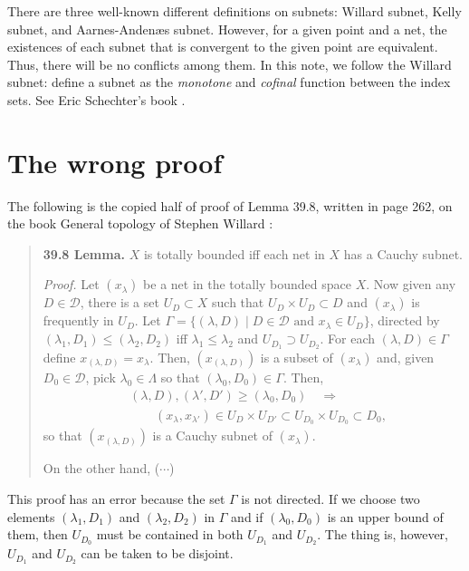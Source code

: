 \documentclass[12pt]{article}
\begin{document}
\begin{rmk}
There are three well-known different definitions on subnets: Willard subnet, Kelly subnet, and Aarnes-Andenæs subnet.
However, for a given point and a net, the existences of each subnet that is convergent to the given point are equivalent.
Thus, there will be no conflicts among them.
In this note, we follow the Willard subnet: define a subnet as the \emph{monotone} and \emph{cofinal} function between the index sets.
See Eric Schechter's book \cite{schechter1996handbook}.
\end{rmk}

\section{The wrong proof}
The following is the copied half of proof of Lemma 39.8, written in page 262, on the book General topology of Stephen Willard \cite{willard2012general}:

\begin{quote}
\textbf{39.8 Lemma.}
$X$ is totally bounded iff each net in $X$ has a Cauchy subnet.

\textit{Proof.}
Let $(x_\lambda)$ be a net in the totally bounded space $X$.
Now given any $D\in\mathcal{D}$, there is a set $U_D\subset X$ such that $U_D\times U_D\subset D$ and $(x_\lambda)$ is frequently in $U_D$.
Let $\Gamma=\{(\lambda,D)\mid D\in\mathcal{D}\text{ and }x_\lambda\in U_D\}$, directed by $(\lambda_1,D_1)\le(\lambda_2,D_2)$ iff $\lambda_1\le\lambda_2$ and $U_{D_1}\supset U_{D_2}$.
For each $(\lambda,D)\in\Gamma$ define $x_{(\lambda,D)}=x_\lambda$.
Then, $(x_{(\lambda,D)})$ is a subset of $(x_\lambda)$ and, given $D_0\in\mathcal{D}$, pick $\lambda_0\in\Lambda$ so that $(\lambda_0,D_0)\in\Gamma$.
Then,
\begin{align*}
&(\lambda,D),(\lambda',D')\ge(\lambda_0,D_0)\quad\Rightarrow \\
&\qquad(x_\lambda,x_{\lambda'})\in U_D\times U_{D'}\subset U_{D_0}\times U_{D_0}\subset D_0,
\end{align*}
so that $(x_{(\lambda,D)})$ is a Cauchy subnet of $(x_\lambda)$.

On the other hand, ($\cdots$)
\end{quote}

This proof has an error because the set $\Gamma$ is not directed.
If we choose two elements $(\lambda_1,D_1)$ and $(\lambda_2,D_2)$ in $\Gamma$ and if $(\lambda_0,D_0)$ is an upper bound of them, then $U_{D_0}$ must be contained in both $U_{D_1}$ and $U_{D_2}$.
The thing is, however, $U_{D_1}$ and $U_{D_2}$ can be taken to be disjoint.
\end{document}
